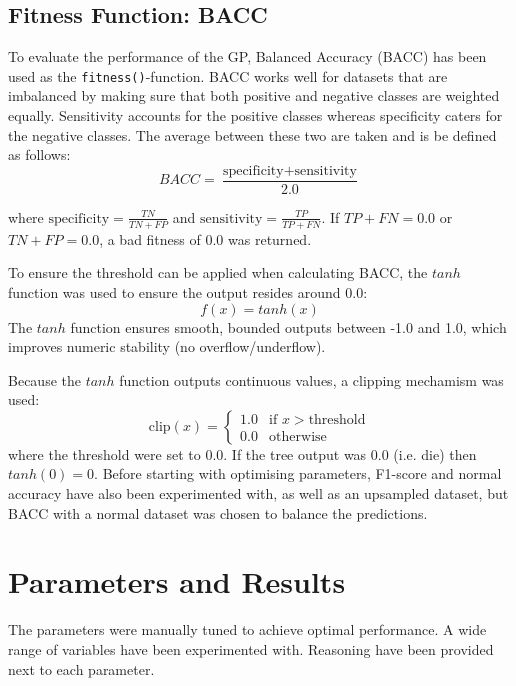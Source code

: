 \documentclass{article}
\begin{document}
\subsection{Fitness Function: BACC}
\label{fitness}
To evaluate the performance of the GP, Balanced Accuracy (BACC) has been used as the \texttt{fitness()}-function. BACC works well for datasets that are imbalanced by making sure that both positive and negative classes are weighted equally. Sensitivity accounts for the positive classes whereas specificity caters for the negative classes. The average between these two are taken and is be defined as follows:
\begin{equation}\label{BACC}
  BACC = \frac{\text{specificity} + \text{sensitivity}}{2.0}
\end{equation}

where \(\text{specificity} = \frac{TN}{TN + FP}\) and \(\text{sensitivity} = \frac{TP}{TP + FN}\). If \(TP + FN = 0.0\) or \(TN + FP = 0.0\), a bad fitness of \(0.0\) was returned.

To ensure the threshold can be applied when calculating BACC, the \(tanh\) function was used to ensure the output resides around \(0.0\):
\begin{equation}\label{eq:sigmoid}
  f(x) = tanh(x)
\end{equation}
The \(tanh\) function ensures smooth, bounded outputs between -1.0 and 1.0, which improves numeric stability (no overflow/underflow).

Because the \(tanh\) function outputs continuous values, a clipping mechamism was used:
\begin{equation}
\text{clip}(x)=
    \begin{cases}
        1.0 & \text{if } x > \text{threshold}\\
        0.0 & \text{otherwise}
    \end{cases}
\end{equation}
where the threshold were set to 0.0. If the tree output was 0.0 (i.e. die) then \(tanh(0) = 0\). Before starting with optimising parameters, F1-score and normal accuracy have also been experimented with, as well as an upsampled dataset, but BACC with a normal dataset was chosen to balance the predictions.

\section{Parameters and Results}
\label{GPsetup}
The parameters were manually tuned to achieve optimal performance. A wide range of variables have been experimented with. Reasoning have been provided next to each parameter.
\end{document}
